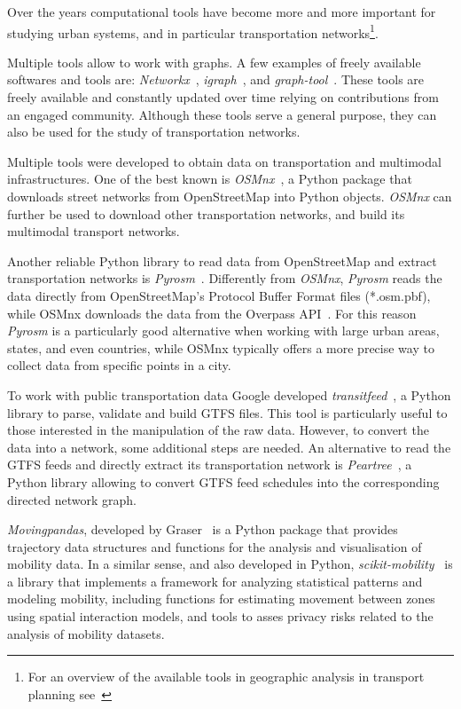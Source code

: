 Over the years computational tools have become more and more important for studying urban systems, and in particular transportation networks\footnote{For an overview of the available tools in geographic analysis in transport planning see~\cite{lovelace2021open}}. 

Multiple tools allow to work with graphs. A few examples of freely available softwares and tools are: \textit{Networkx}~\cite{hagberg2008networkx}, \textit{igraph}~\cite{csardi2006igraph}, and \textit{graph-tool}~\cite{peixoto2014graph-tool}. These tools are freely available and constantly updated over time relying on contributions from an engaged community. Although these tools serve a general purpose, they can also be used for the study of transportation networks.

Multiple tools were developed to obtain data on transportation and multimodal infrastructures. One of the best known is \textit{OSMnx}~\cite{boeing2017osmnx}, a Python package that downloads street networks from OpenStreetMap into Python objects. \textit{OSMnx} can further be used to download other transportation networks, and build its multimodal transport networks. 

Another reliable Python library to read data from OpenStreetMap and extract transportation networks is \textit{Pyrosm}~\cite{tenkanen2020pyrosm}. Differently from \textit{OSMnx}, \textit{Pyrosm} reads the data directly from OpenStreetMap's Protocol Buffer Format files (*.osm.pbf), while OSMnx downloads the data from the Overpass API~\cite{overpass}. For this reason \textit{Pyrosm} is a particularly good alternative when working with large urban areas, states, and even countries, while OSMnx typically offers a more precise way to collect data from specific points in a city.

To work with public transportation data Google developed \textit{transitfeed}~\cite{google2020gtfs}, a Python library to parse, validate and build GTFS files. This tool is particularly useful to those interested in the manipulation of the raw data. However, to convert the data into a network, some additional steps are needed. An alternative to read the GTFS feeds and directly extract its transportation network is \textit{Peartree}~\cite{butts2021peartree}, a Python library allowing to convert GTFS feed schedules into the corresponding directed network graph.

\textit{Movingpandas}, developed by Graser~\cite{graser2019movingpandas} is a Python package that provides trajectory data structures and functions for the analysis and visualisation of mobility data. In a similar sense, and also developed in Python, \textit{scikit-mobility}~\cite{pappalardo2021scikitmobility} is a library that implements a framework for analyzing statistical patterns and modeling mobility, including functions for estimating movement between zones using spatial interaction models, and tools to asses privacy risks related to the analysis of mobility datasets.

